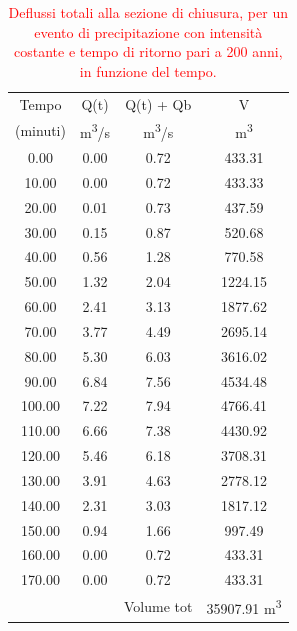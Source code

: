 \begin{table}[H] \centering
    \caption{\textcolor{red}{Deflussi totali alla sezione di chiusura, per un evento di precipitazione con intensità costante e tempo di ritorno pari a 200 anni, in funzione del tempo.}}
    \begin{tabular}{cccc}
        \toprule
        Tempo    & Q(t)   & Q(t) + Qb           & V                 \\
        (minuti) & \unit{m^3/s}& \unit{m^3/s} & \unit{m^3}    \\
        \midrule
        0.00     & 0.00   & 0.72                & 433.31            \\
        10.00    & 0.00   & 0.72                & 433.33            \\
        20.00    & 0.01   & 0.73                & 437.59            \\
        30.00    & 0.15   & 0.87                & 520.68            \\
        40.00    & 0.56   & 1.28                & 770.58            \\
        50.00    & 1.32   & 2.04                & 1224.15           \\
        60.00    & 2.41   & 3.13                & 1877.62           \\
        70.00    & 3.77   & 4.49                & 2695.14           \\
        80.00    & 5.30   & 6.03                & 3616.02           \\
        90.00    & 6.84   & 7.56                & 4534.48           \\
        100.00   & 7.22   & 7.94                & 4766.41           \\
        110.00   & 6.66   & 7.38                & 4430.92           \\
        120.00   & 5.46   & 6.18                & 3708.31           \\
        130.00   & 3.91   & 4.63                & 2778.12           \\
        140.00   & 2.31   & 3.03                & 1817.12           \\
        150.00   & 0.94   & 1.66                & 997.49            \\
        160.00   & 0.00   & 0.72                & 433.31            \\
        170.00   & 0.00   & 0.72                & 433.31            \\
        \bottomrule
                 &        & Volume tot & 35907.91 \unit{m^3}
        \end{tabular}
        \end{table}

